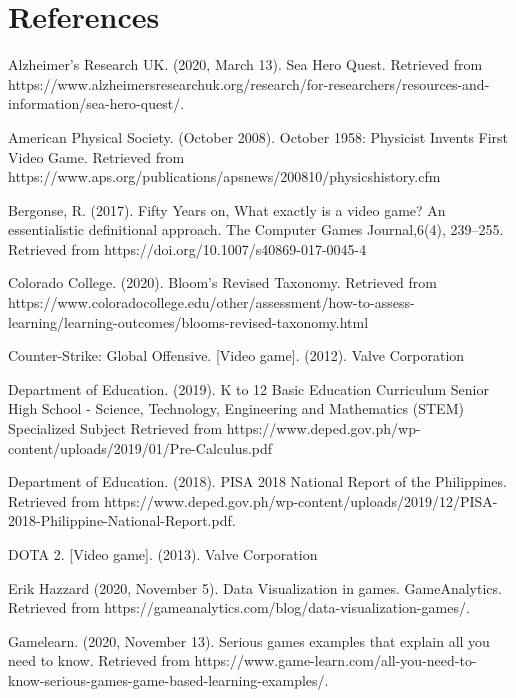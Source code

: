 %
%
%                 

\chapter{References}
\label{sec:References}

\sloppy
\begin{adjustwidth}{0.1in}{0.1in}
Alzheimer's Research UK. (2020, March 13). Sea Hero Quest. Retrieved from https://www.alzheimersresearchuk.org/research/for-researchers/resources-and-information/sea-hero-quest/. 

American Physical Society. (October 2008). October 1958: Physicist Invents First Video Game. Retrieved from https://www.aps.org/publications/apsnews/200810/physicshistory.cfm

Bergonse, R. (2017). Fifty Years on, What exactly is a video game? An essentialistic definitional approach. The Computer Games Journal,6(4), 239–255. Retrieved from
https://doi.org/10.1007/s40869-017-0045-4

Colorado College. (2020). Bloom’s Revised Taxonomy. Retrieved from https://www.coloradocollege.edu/other/assessment/how-to-assess-learning/learning-outcomes/blooms-revised-taxonomy.html

Counter-Strike: Global Offensive. [Video game]. (2012). Valve Corporation

Department of Education. (2019). K to 12 Basic Education Curriculum Senior High School - Science, Technology, Engineering and Mathematics (STEM) Specialized Subject Retrieved from https://www.deped.gov.ph/wp-content/uploads/2019/01/Pre-Calculus.pdf

Department of Education. (2018). PISA 2018 National Report of the Philippines. Retrieved from https://www.deped.gov.ph/wp-content/uploads/2019/12/PISA-2018-Philippine-National-Report.pdf.

DOTA 2. [Video game]. (2013). Valve Corporation 


Erik Hazzard (2020, November 5). Data Visualization in games. GameAnalytics. Retrieved from https://gameanalytics.com/blog/data-visualization-games/. 

Gamelearn. (2020, November 13). Serious games examples that explain all you need to know. Retrieved from https://www.game-learn.com/all-you-need-to-know-serious-games-game-based-learning-examples/. 


\end{adjustwidth}
